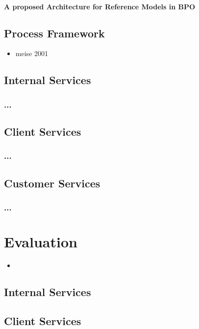 \subsubsection{A proposed Architecture for Reference Models in BPO}
	\section{Process Framework}
	\begin{itemize}
		\item meise 2001
	\end{itemize}
	\section{Internal Services}
	\subsection{...}
	\section{Client Services}
	\subsection{...}
	\section{Customer Services}
	\subsection{...}
\chapter{Evaluation}
	\begin{itemize}
		\item 
	\end{itemize}
	\section{Internal Services}
	\section{Client Services}
